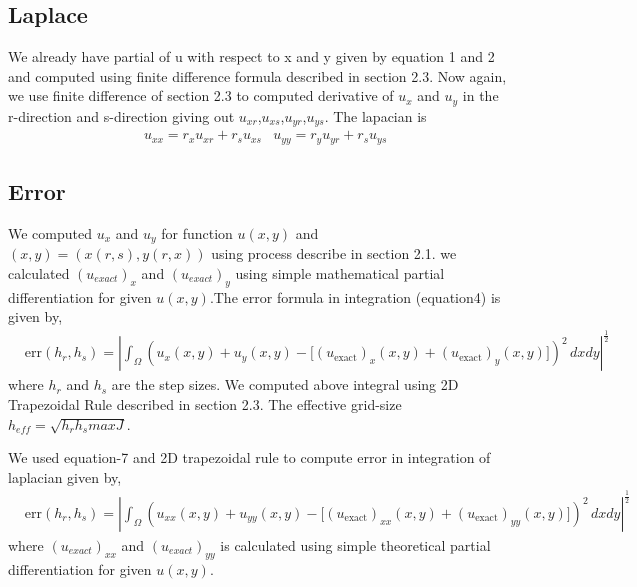 \documentclass{article}
\begin{document}
\subsection{Laplace} 
We already have partial of u with respect  to x and y given by equation 1 and 2 and computed using finite difference formula described in section 2.3. Now again, we use finite difference of section 2.3 to computed derivative of $u_x$ and $u_y$ in the r-direction and s-direction giving out $u_{xr}$,$u_{xs}$,$u_{yr}$,$u_{ys}$. The lapacian is 
\begin{align}
   & u_{xx}=r_x u_{xr}+r_s u_{xs}
   & u_{yy}=r_y u_{yr}+r_s u_{ys}
   \end{align}
\subsection{Error}
We computed $u_x$ and $u_y$ for function $u(x,y)$  and $(x,y)=(x(r,s),y(r,x))$ using process describe in section 2.1. we calculated $(u_{exact})_x$ and $(u_{exact})_y$ using simple mathematical partial differentiation for given $u(x,y)$.The error formula in integration (equation4) is given by,
\begin{align}
    & \text{err}(h_r, h_s)
        = \left|
            \int_{\Omega}
                \left(
                    u_x(x, y) + u_y(x, y) -
                        \big[
                            (u_\text{exact})_x(x, y) + (u_\text{exact})_y(x, y)
                        \big]
                \right)^2
                \, dx dy \right|^{\tfrac{1}{2}} 
\end{align}
        where $h_r$ and $h_s$ are the step sizes. We computed above integral using 2D Trapezoidal Rule described in section 2.3. The effective grid-size $h_{eff}=\sqrt{h_r h_s maxJ}$.

We used equation-7 and 2D trapezoidal rule to compute error in integration of laplacian  given by, 
\begin{align}
    & \text{err}(h_r, h_s)
        = \left|
            \int_{\Omega}
                \left(
                    u_{xx}(x, y) + u_{yy}(x, y) -
                        \big[
                            (u_\text{exact})_{xx}(x, y) + (u_\text{exact})_{yy}(x, y)
                        \big]
                \right)^2
                \, dx dy \right|^{\tfrac{1}{2}} 
\end{align}
where $(u_{exact})_{xx}$ and $(u_{exact})_{yy}$ is calculated using simple theoretical partial differentiation for given $u(x,y)$.
\end{document}
